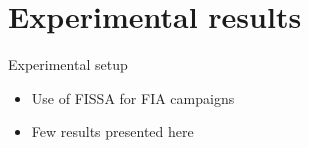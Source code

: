 \section{Experimental results}

\begin{frame}{Experimental setup}
    \begin{block}{}
        \begin{itemize}
            \item Use of FISSA for FIA campaigns
            \item Few results presented here
        \end{itemize}
    \end{block}
\end{frame}
